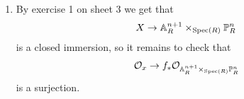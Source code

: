 \begin{exercise}{3}
    \begin{enumerate}
        \item By exercise 1 on sheet 3 we get that 
        \begin{align*}
            X \to \mathbb{A}_R^{n+1} \times_{\operatorname{Spec}(R)} \mathbb{P}^n_R
        \end{align*}
        is a closed immersion, so it remains to check that 
        \begin{align*}
            \mathcal{O}_x \to f_* \mathcal{O}_{\mathbb{A}_R^{n+1} \times_{\operatorname{Spec}(R)} \mathbb{P} ^n_R}
        \end{align*}
        is a surjection.
    \end{enumerate}
\end{exercise}

